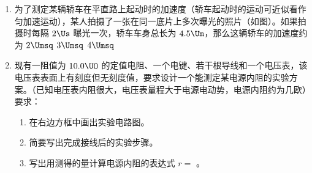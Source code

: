 \documentclass[\gkver]{gaokaozhenti}
\begin{document}
\begin{enumerate}
\item
为了测定某辆轿车在平直路上起动时的加速度（轿车起动时的运动可近似看作匀加速运动），某人拍摄了一张在同一底片上多次曝光的照片（如图）。如果拍摄时每隔 $2\Us$ 曝光一次，轿车车身总长为 $4.5\Um$，那么这辆轿车的加速度约为
\onepicture[w=12cm]{}
\fourchoices[answer=B]
{$1\Umsq$}
{$2\Umsq$}
{$3\Umsq$}
{$4\Umsq$}

\item
现有一阻值为 $10.0\UO$ 的定值电阻、一个电键、若干根导线和一个电压表，该电压表表面上有刻度但无刻度值，要求设计一个能测定某电源内阻的实验方案。（已知电压表内阻很大，电压表量程大于电源电动势，电源内阻约为几欧）要求：
\begin{enumerate}
	\item
	在右边方框中画出实验电路图。
	\item
	简要写出完成接线后的实验步骤。
	\item
	写出用测得的量计算电源内阻的表达式 $r =$ 。
\end{enumerate}


\end{enumerate}
\end{document}
